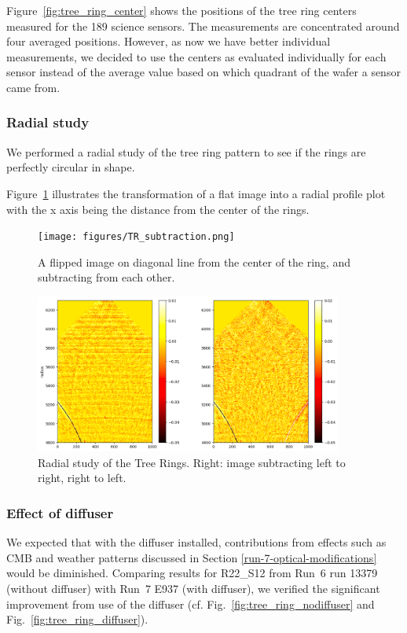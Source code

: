 Figure~\ref{fig:tree_ring_center} shows the positions of the tree ring centers measured for the 189 science sensors. The measurements are concentrated around four averaged positions. However, as now we have better individual measurements, we decided to use the centers as evaluated individually for each sensor instead of the average value based on which quadrant of the wafer a sensor came from. 


\subsubsection{Radial study}
We performed a radial study of the tree ring pattern to see if the rings are perfectly circular in shape. 

Figure~\ref{fig:tree-ring-radial-transform} illustrates the transformation of a flat image into a radial profile plot with the x axis being the distance from the center of the rings. 

\begin{figure}[ht]
\centering
\texttt{[image: figures/TR\_subtraction.png]}
\caption{A flipped image on diagonal line from the center of the ring, and subtracting from each other.}
\label{fig:tree-ring-radial-transform}
\end{figure}

\begin{figure}[ht]
\centering
\includegraphics[width=0.9\textwidth]{figures/TR_radial.png}
\caption{Radial study of the Tree Rings. Right: image subtracting left to right, right to left.}
\end{figure}

\subsubsection{Effect of diffuser}
We expected that with the diffuser installed, contributions from effects such as CMB and weather patterns discussed in Section \ref{run-7-optical-modifications} would be diminished. Comparing results for R22\_S12 from Run~6 run 13379 (without diffuser) with Run~7 E937 (with diffuser), we verified the significant improvement from use of the diffuser (cf. Fig.~\ref{fig:tree_ring_nodiffuser} and Fig.~\ref{fig:tree_ring_diffuser}).

